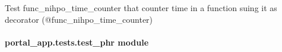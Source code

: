 \documentclass[letterpaper,10pt,english]{sphinxmanual}
\begin{document}
\begin{fulllineitems}
\begin{fulllineitems}
\label{\detokenize{CE_app.tests:CE_app.tests.test_nihpo_functions.TrialTestCase.test_func_nihpo_time_counter}}
\sphinxAtStartPar
Test func\_nihpo\_time\_counter that counter time in a function suing it as decorator (@func\_nihpo\_time\_counter)

\end{fulllineitems}


\end{fulllineitems}



\paragraph{portal\_app.tests.test\_phr module}
\label{\detokenize{CE_app.tests:module-CE_app.tests.test_phr}}\label{\detokenize{CE_app.tests:portal-app-tests-test-phr-module}}
\end{document}
